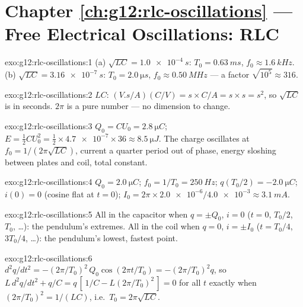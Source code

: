 \section*{Chapter \ref{ch:g12:rlc-oscillations} --- Free Electrical Oscillations: RLC}

\begin{solution}{exo:g12:rlc-oscillations:1}
(a) $\sqrt{LC} = \qty{1.0e-4}{s}$: $T_0 = \qty{0.63}{ms}$,
$f_0 \approx \qty{1.6}{kHz}$. (b) $\sqrt{LC} = \qty{3.16e-7}{s}$:
$T_0 = \qty{2.0}{\micro s}$, $f_0 \approx \qty{0.50}{MHz}$ --- a
factor $\sqrt{10^5} \approx 316$.
\end{solution}

\begin{solution}{exo:g12:rlc-oscillations:2}
$LC$: $(\unit{V.s/A})(\unit{C/V}) = \unit{s} \times \unit{C/A} =
\unit{s} \times \unit{s} = \unit{s^2}$, so $\sqrt{LC}$ is in seconds.
$2\pi$ is a pure number --- no dimension to change.
\end{solution}

\begin{solution}{exo:g12:rlc-oscillations:3}
$Q_0 = CU_0 = \qty{2.8}{\micro C}$; $E = \tfrac12 CU_0^2 =
\tfrac12 \times \num{4.7e-7} \times 36 \approx \qty{8.5}{\micro J}$.
The charge oscillates at $f_0 = 1/(2\pi\sqrt{LC})$, current a quarter
period out of phase, energy sloshing between plates and coil, total
constant.
\end{solution}

\begin{solution}{exo:g12:rlc-oscillations:4}
$Q_0 = \qty{2.0}{\micro C}$; $f_0 = 1/T_0 = \qty{250}{Hz}$;
$q(T_0/2) = \qty{-2.0}{\micro C}$; $i(0) = 0$ (cosine flat at $t=0$);
$I_0 = 2\pi \times \num{2.0e-6}/\num{4.0e-3} \approx \qty{3.1}{mA}$.
\end{solution}

\begin{solution}{exo:g12:rlc-oscillations:5}
All in the capacitor when $q = \pm Q_0$, $i = 0$ ($t = 0$, $T_0/2$,
$T_0$, \dots): the pendulum's extremes. All in the coil when $q = 0$,
$i = \pm I_0$ ($t = T_0/4$, $3T_0/4$, \dots): the pendulum's lowest,
fastest point.
\end{solution}

\begin{solution}{exo:g12:rlc-oscillations:6}
$d^2q/dt^2 = -(2\pi/T_0)^2\,Q_0\cos(2\pi t/T_0) = -(2\pi/T_0)^2 q$,
so $L\,d^2q/dt^2 + q/C = q\,[\,1/C - L(2\pi/T_0)^2\,] = 0$ for all $t$
exactly when $(2\pi/T_0)^2 = 1/(LC)$, i.e.\ $T_0 = 2\pi\sqrt{LC}$.
\end{solution}

